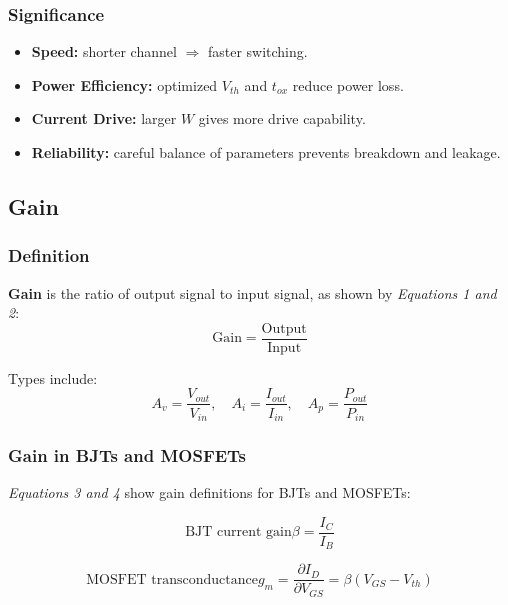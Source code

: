 \documentclass[a4paper,12pt]{article}
\begin{document}
\subsubsection{Significance}
\begin{itemize}
    \item \textbf{Speed:} shorter channel $\Rightarrow$ faster switching.
    \item \textbf{Power Efficiency:} optimized $V_{th}$ and $t_{ox}$ reduce power loss.
    \item \textbf{Current Drive:} larger $W$ gives more drive capability.
    \item \textbf{Reliability:} careful balance of parameters prevents breakdown and leakage.
\end{itemize}

\subsection{Gain}

\subsubsection{Definition}
\textbf{Gain} is the ratio of output signal to input signal, as shown by \textit{Equations 1 and 2}:
\begin{equation}
    \text{Gain} = \frac{\text{Output}}{\text{Input}}
\end{equation}

Types include:
\begin{equation}
A_v = \frac{V_{out}}{V_{in}}, \quad
A_i = \frac{I_{out}}{I_{in}}, \quad
A_p = \frac{P_{out}}{P_{in}}
\end{equation}

\subsubsection{Gain in BJTs and MOSFETs}

\textit{Equations 3 and 4} show gain definitions for BJTs and MOSFETs:

\begin{equation}
    \text{BJT current gain} \beta = \frac{I_C}{I_B}
\end{equation}

\begin{equation}
    \text{MOSFET transconductance} g_m = \frac{\partial I_D}{\partial V_{GS}} = \beta(V_{GS} - V_{th})
\end{equation}
\end{document}
